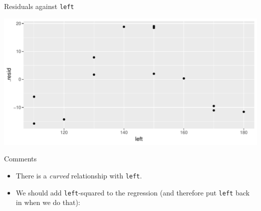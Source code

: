\begin{frame}[fragile]{Residuals against \texttt{left}}
  
\begin{knitrout}
\color{fgcolor}\begin{kframe}
\begin{alltt}
\hlkwb{=}
\hlstd{(}\hlopt{+}\hlstd{()}\hlopt{+}\hlstd{()}
\end{alltt}


{\ttfamily\noindent\itshape\color{messagecolor}{`geom\_smooth()` using method = 'loess'}}\end{kframe}
\includegraphics[width=\maxwidth]{figure/basingstoke-1} 

\end{knitrout}
  
\end{frame}

\begin{frame}[fragile]{Comments}
  
  \begin{itemize}
  \item There is a \emph{curved} relationship with \texttt{left}.
  \item We should add \texttt{left}-squared to the regression (and
    therefore put \texttt{left} back in when we do that):
    
\begin{knitrout}
\color{fgcolor}\begin{kframe}
\begin{alltt}
\hlkwb{=}\hlopt{*}
\hlkwb{=}\hlopt{~}\hlopt{+}\hlopt{+}
\end{alltt}
\end{kframe}
\end{knitrout}
  \end{itemize}
  
\end{frame}

